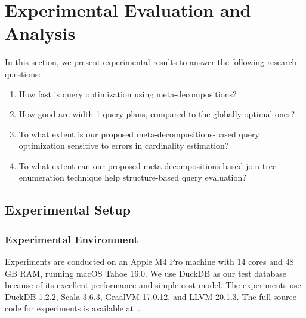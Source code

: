 
\section{Experimental Evaluation and Analysis}
\label{sec:exp}

In this section, we present experimental results to answer the following research questions:

\begin{enumerate}[label=\textbf{(RQ\arabic*)},ref=(RQ\arabic*),leftmargin=*]
    \item\label{RQ1}\gdef\Giref{\ref{RQ1}} How fast is query optimization using meta-decompositions?
	\item\label{RQ2}\gdef\Giref{\ref{RQ2}} How good are width-1 query plans, compared to the globally optimal ones?
    \item\label{RQ3}\gdef\Giref{\ref{RQ3}} To what extent is our proposed meta-decompositions-based query optimization sensitive to errors in cardinality estimation?
    \item\label{RQ4}\gdef\Giref{\ref{RQ4}} To what extent can our proposed meta-decompositions-based join tree enumeration technique help structure-based query evaluation?
\end{enumerate}

\subsection{Experimental Setup}
\subsubsection{Experimental Environment} Experiments are conducted on an Apple M4 Pro machine with 14 cores and 48 GB RAM, running macOS Tahoe 16.0. We use DuckDB as our test database because of its excellent performance and simple cost model. The experiments use DuckDB 1.2.2, Scala 3.6.3, GraalVM 17.0.12, and LLVM 20.1.3. The full source code for experiments is available at~\cite{github}.

